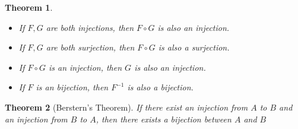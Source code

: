 \documentclass{ctexart}
\newcommand{\。}{．} %
\newenvironment{huangse}{
    \begin{tcolorbox}[enhanced, breakable, colback=qhuang, boxrule=0pt, frame hidden,
        borderline west={0.7mm}{0.1mm}{shuang}]
    }
    {\end{tcolorbox}}
\theoremstyle{t} %
\newtheorem{dlhj}{\color{shuang} Theorem}[subsection]
\newenvironment{dl}{\begin{huangse}\begin{dlhj}}{\end{dlhj}\end{huangse}}
\begin{document}
\begin{dl} \quad
    \begin{itemize}
        \item If $F, G$ are both injections, then $F \circ G$ is also an injection.
        \item If $F, G$ are both surjection, then $F \circ G$ is also a surjection.
        \item If $F \circ G$ is an injection, then $G$ is also an injection.
        \item If $F$ is an bijection, then $F^{-1}$ is also a bijection.
    \end{itemize}
\end{dl}

\begin{dl}[Berstern's Theorem]
    If there exist an injection from $A$ to $B$ and an injection from $B$ to $A$, then there exists a bijection between $A$ and $B$
\end{dl}
\end{document}
